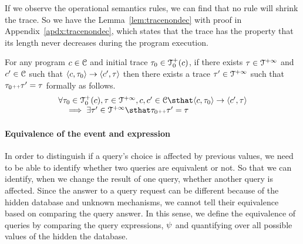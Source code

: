 {{If we observe the operational semantics rules, we can find that no rule will shrink the trace. 
So we have the Lemma~\ref{lem:tracenondec} with proof in Appendix~\ref{apdx:tracenondec}, 
which states that the trace has the property that its length never decreases during the program execution.
\begin{lem}
\label{lem:tracenondec}
For any program $c \in \mathcal{C}$ and initial trace $\mathtt{\tau}_0 \in \mathcal{T}^{+}_0(c)$,
if there exists $\mathtt{\tau} \in \mathcal{T}^{+\infty}$ and $c' \in \mathcal{C} $ such that $\langle c, \mathtt{\tau}_0 \rangle \rightarrow \langle c', \mathtt{\tau} \rangle $
then there exists a trace $\mathtt{\tau}' \in \mathcal{T}^{+\infty}$ such that $\mathtt{\tau}_0 {\scriptscriptstyle ++} \mathtt{\tau}' = \mathtt{\tau}$ formally as follows.
%
\[
 \begin{array}{l}
 \forall \trace_0 \in \ftdom_0(c), \trace \in \tdom, c, c' \in \cdom \sthat
 \config{c, \trace_0} \rightarrow \config{c', \trace} 
 \\ \quad
 \implies \exists \trace' \in \tdom \sthat \trace_0 \tracecat \trace' = \trace 
 \end{array}
\]
\end{lem}

\paragraph{Equivalence of the event and expression}

In order to distinguish if a query's choice is affected by previous values, 
we need to be able to identify whether two queries are equivalent or not. So that we can identify, when we change the result of one query, 
whether another query is affected. 
Since the answer to a query request can be different because of the hidden database and unknown mechanisms,
we cannot tell their equivalence based on comparing the query answer.
In this sense, we 
define the equivalence of queries by comparing the query expressions, $\psi$
and quantifying over all possible values of the hidden the database.

}}
